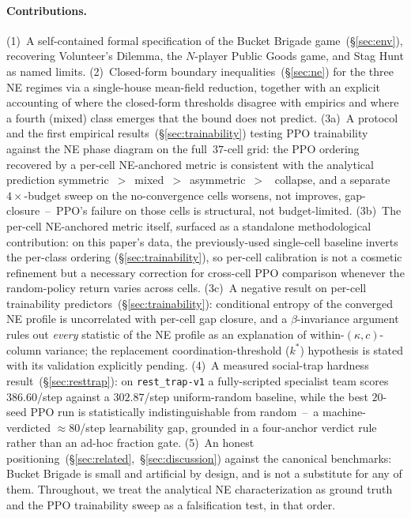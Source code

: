 \documentclass{anvil-paper}
\begin{document}
\paragraph{Contributions.} (1)~A self-contained formal specification of the
Bucket Brigade game~(\S\ref{sec:env}), recovering Volunteer's Dilemma, the
$N$-player Public Goods game, and Stag Hunt as named limits.
(2)~Closed-form boundary inequalities~(\S\ref{sec:ne}) for the three NE
regimes via a single-house mean-field reduction, together with an explicit
accounting of where the closed-form thresholds disagree with empirics and
where a fourth (\textsf{mixed}) class emerges that the bound does not
predict. (3a)~A protocol and the first empirical
results~(\S\ref{sec:trainability}) testing PPO trainability against the
NE phase diagram on the full~$37$-cell grid: the PPO ordering recovered
by a per-cell NE-anchored metric is consistent with the analytical
prediction
\textsf{symmetric}~$>$~\textsf{mixed}~$>$~\textsf{asymmetric}~$>$~%
\textsf{collapse}, and a separate~$4{\times}$-budget sweep on the
no-convergence cells worsens, not improves, gap-closure~--~PPO's
failure on those cells is structural, not budget-limited.
(3b)~The per-cell NE-anchored metric itself, surfaced as a standalone
methodological contribution: on this paper's data, the previously-used
single-cell baseline inverts the per-class ordering (\S\ref{sec:trainability}),
so per-cell calibration is not a cosmetic refinement but a necessary
correction for cross-cell PPO comparison whenever the random-policy
return varies across cells.
(3c)~A negative result on per-cell trainability
predictors~(\S\ref{sec:trainability}): conditional entropy of the
converged NE profile is uncorrelated with per-cell gap closure, and a
$\beta$-invariance argument rules out \emph{every} statistic of the NE
profile as an explanation of within-$(\kappa,c)$-column variance; the
replacement coordination-threshold ($k^{*}$) hypothesis is stated with
its validation explicitly pending.
(4)~A measured social-trap hardness result~(\S\ref{sec:resttrap}): on
\texttt{rest\_trap-v1} a fully-scripted specialist team scores
$386.60$/step against a $302.87$/step uniform-random baseline, while the
best $20$-seed PPO run is statistically indistinguishable from
random~--~a machine-verdicted ${\approx}80$/step learnability gap,
grounded in a four-anchor verdict rule rather than an ad-hoc fraction
gate. (5)~An honest
positioning~(\S\ref{sec:related},~\S\ref{sec:discussion}) against the
canonical benchmarks: Bucket Brigade is small and artificial by design,
and is not a substitute for any of them.
Throughout, we treat the analytical NE characterization as ground truth and
the PPO trainability sweep as a falsification test, in that order.
\end{document}
